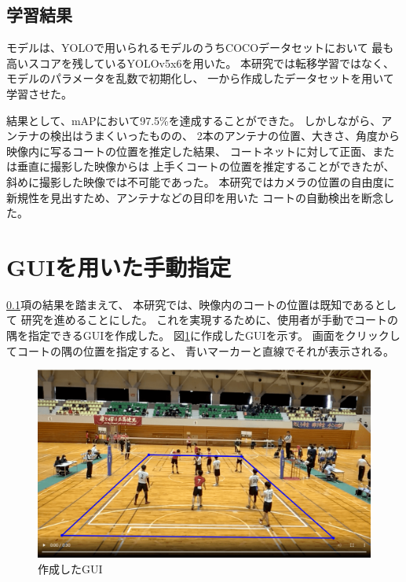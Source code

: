 \documentclass[a4j, fleqn, 12pt]{jsreport}
\begin{document}
        \subsection{学習結果} \label{subsec:antenna_result}
            モデルは、YOLOで用いられるモデルのうちCOCOデータセット\cite{Microsoft}において
            最も高いスコアを残しているYOLOv5x6を用いた。
            本研究では転移学習ではなく、モデルのパラメータを乱数で初期化し、
            一から作成したデータセットを用いて学習させた。

            結果として、mAPにおいて97.5\%を達成することができた。
            しかしながら、アンテナの検出はうまくいったものの、
            2本のアンテナの位置、大きさ、角度から映像内に写るコートの位置を推定した結果、
            コートネットに対して正面、または垂直に撮影した映像からは
            上手くコートの位置を推定することができたが、
            斜めに撮影した映像では不可能であった。
            本研究ではカメラの位置の自由度に新規性を見出すため、アンテナなどの目印を用いた
            コートの自動検出を断念した。

    \section{GUIを用いた手動指定}
        \ref{subsec:antenna_result}項の結果を踏まえて、
        本研究では、映像内のコートの位置は既知であるとして
        研究を進めることにした。
        これを実現するために、使用者が手動でコートの隅を指定できるGUIを作成した。
        図\ref{fig:GUI}に作成したGUIを示す。
        画面をクリックしてコートの隅の位置を指定すると、
        青いマーカーと直線でそれが表示される。

        \begin{figure}[ht]
            \centering
            \includegraphics[width=0.8\hsize]{images/gui.png}
            \caption{作成したGUI}
            \label{fig:GUI}
        \end{figure}
\end{document}
